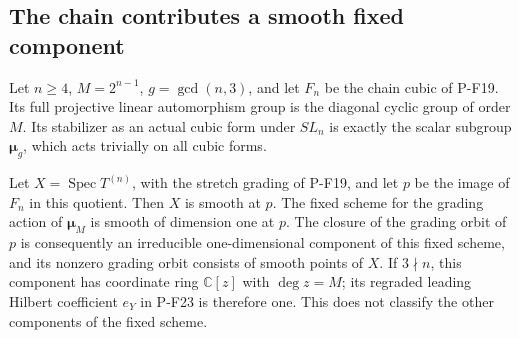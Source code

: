 \subsection{The chain contributes a smooth fixed component}

\begin{proposition}
\label{prop:chainsmoothcomponent}
Let $n\ge4$, $M=2^{n-1}$, $g=\gcd(n,3)$, and let $F_n$ be the
chain cubic of P-F19. Its full projective linear automorphism group
is the diagonal cyclic group of order $M$. Its stabilizer as an
actual cubic form under $SL_n$ is exactly the scalar subgroup
$\boldsymbol\mu_g$, which acts trivially on all cubic forms.

Let $X=\operatorname{Spec}T^{(n)}$, with the stretch grading of
P-F19, and let $p$ be the image of $F_n$ in this quotient. Then
$X$ is smooth at $p$. The fixed scheme for the grading action of
$\boldsymbol\mu_M$ is smooth of dimension one at $p$.
The closure of the grading orbit of $p$ is consequently an
irreducible one-dimensional component of this fixed scheme,
and its nonzero grading orbit consists of smooth points of $X$.
If $3\nmid n$, this component has coordinate ring
$\mathbb C[z]$ with $\deg z=M$; its regraded leading Hilbert
coefficient $e_Y$ in P-F23 is therefore one.
This does not classify the other components of the fixed scheme.
\end{proposition}


